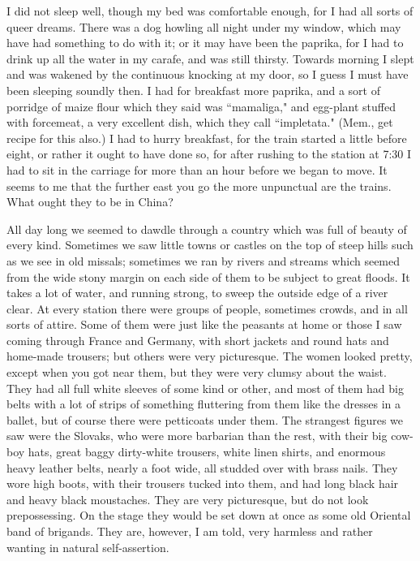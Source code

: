 I did not sleep well, though my bed was comfortable enough, for I had all sorts of queer dreams. There was a dog howling all night under my window, which may have had something to do with it; or it may have been the paprika, for I had to drink up all the water in my carafe, and was still thirsty. Towards morning I slept and was wakened by the continuous knocking at my door, so I guess I must have been sleeping soundly then. I had for breakfast more paprika, and a sort of porridge of maize flour which they said was ``mamaliga," and egg-plant stuffed with forcemeat, a very excellent dish, which they call ``impletata." (Mem., get recipe for this also.) I had to hurry breakfast, for the train started a little before eight, or rather it ought to have done so, for after rushing to the station at 7:30 I had to sit in the carriage for more than an hour before we began to move. It seems to me that the further east you go the more unpunctual are the trains. What ought they to be in China?

All day long we seemed to dawdle through a country which was full of beauty of every kind. Sometimes we saw little towns or castles on the top of steep hills such as we see in old missals; sometimes we ran by rivers and streams which seemed from the wide stony margin on each side of them to be subject to great floods. It takes a lot of water, and running strong, to sweep the outside edge of a river clear. At every station there were groups of people, sometimes crowds, and in all sorts of attire. Some of them were just like the peasants at home or those I saw coming through France and Germany, with short jackets and round hats and home-made trousers; but others were very picturesque. The women looked pretty, except when you got near them, but they were very clumsy about the waist. They had all full white sleeves of some kind or other, and most of them had big belts with a lot of strips of something fluttering from them like the dresses in a ballet, but of course there were petticoats under them. The strangest figures we saw were the Slovaks, who were more barbarian than the rest, with their big cow-boy hats, great baggy dirty-white trousers, white linen shirts, and enormous heavy leather belts, nearly a foot wide, all studded over with brass nails. They wore high boots, with their trousers tucked into them, and had long black hair and heavy black moustaches. They are very picturesque, but do not look prepossessing. On the stage they would be set down at once as some old Oriental band of brigands. They are, however, I am told, very harmless and rather wanting in natural self-assertion.


